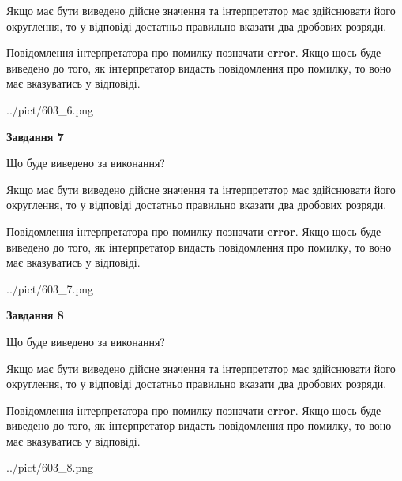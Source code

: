 \documentclass[12pt, ukrainian]{article}
\begin{document}
{\begin {Large}
Якщо має бути виведено дійсне значення та інтерпретатор має здійснювати його округлення, 
то у відповіді достатньо правильно вказати два дробових розряди.

Повідомлення інтерпретатора про помилку позначати \textbf{error}.
Якщо щось буде виведено до того, як інтерпретатор видасть повідомлення про помилку, 
то воно має вказуватись у відповіді. \par

\begin{center}
	{../pict/603_6.png}
\end{center}
\newpage

{\begin {center}\textbf{Завдання 7}\end {center}}\par
Що буде виведено за виконання? \par

Якщо має бути виведено дійсне значення та інтерпретатор має здійснювати його округлення, 
то у відповіді достатньо правильно вказати два дробових розряди.

Повідомлення інтерпретатора про помилку позначати \textbf{error}.
Якщо щось буде виведено до того, як інтерпретатор видасть повідомлення про помилку, 
то воно має вказуватись у відповіді. \par

\begin{center}
	{../pict/603_7.png}
\end{center}
\newpage

{\begin {center}\textbf{Завдання 8}\end {center}}\par
Що буде виведено за виконання? \par

Якщо має бути виведено дійсне значення та інтерпретатор має здійснювати його округлення, 
то у відповіді достатньо правильно вказати два дробових розряди.

Повідомлення інтерпретатора про помилку позначати \textbf{error}.
Якщо щось буде виведено до того, як інтерпретатор видасть повідомлення про помилку, 
то воно має вказуватись у відповіді. \par

\begin{center}
	{../pict/603_8.png}
\end{center}
\newpage


\end{Large}}
\end{document}
